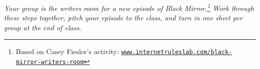 


\usepackage[hidelinks]{hyperref}

\flushbottom

\newcommand{\wsline}{\leavevmode\leaders\hrule height 0.4pt\hfill\kern0pt\par}

\newcommand{\wscircletable}[5]{%
  \setlength{\wsheadht}{2.2\baselineskip}%
  \begin{tabularx}{\textwidth}{|X|X|X|X|X|}
    \hline
    \wsvcell{\wsheadht}{\centering #1} & \wsvcell{\wsheadht}{\centering #2} &
    \wsvcell{\wsheadht}{\centering #3} & \wsvcell{\wsheadht}{\centering #4} &
    \wsvcell{\wsheadht}{\centering #5} \\
    \hline
  \end{tabularx}%
}

\newcommand{\wscheck}[1]{%
  \stepcounter{wsquestion}%
  \par\noindent(\thewsquestion)~\fbox{\rule{0pt}{0.7em}\rule{0.7em}{0pt}}~#1\par
}



\wsheader

\textit{Your group is the writers room for a new episode of Black Mirror.\footnote{Based on Casey Fiesler's activity: \href{https://www.internetruleslab.com/black-mirror-writers-room}{\nolinkurl{www.internetruleslab.com/black-mirror-writers-room}}} Work through these steps together, pitch your episode to the class, and turn in one sheet per group at the end of class.}


\vspace{0.2\baselineskip}


\vspace{0.4\baselineskip}


\vfill
\newpage


